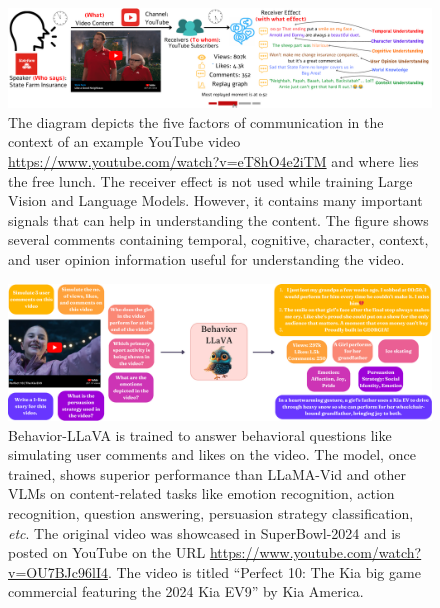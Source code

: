 \begin{figure}[h]
    \centering
        \includegraphics[width=\textwidth]{images/bllava-fig_2.pdf}
    \caption{The diagram depicts the five factors of communication in the context of an example YouTube video \url{https://www.youtube.com/watch?v=eT8hO4e2iTM} and where lies the free lunch. The receiver effect is not used while training Large Vision and Language Models. However, it contains many important signals that can help in understanding the content. The figure shows several comments containing temporal, cognitive, character, context, and user opinion information useful for understanding the video. \label{fig:synthetic-data-vs-generation-performance} }
\end{figure}



\begin{figure}[]

\centering
        \includegraphics[width=\textwidth]{images/bllava-fig_1.pdf}
    \caption{Behavior-LLaVA is trained to answer behavioral questions like simulating user comments and likes on the video. The model, once trained, shows superior performance than LLaMA-Vid and other VLMs on content-related tasks like emotion recognition, action recognition, question answering, persuasion strategy classification, \textit{etc}. The original video was showcased in SuperBowl-2024 and is posted on YouTube on the URL \url{https://www.youtube.com/watch?v=OU7BJc96lI4}. The video is titled ``Perfect 10: The Kia big game commercial featuring the 2024 Kia EV9'' by Kia America. \label{fig:Behavior-LLaVA}}

\end{figure}


